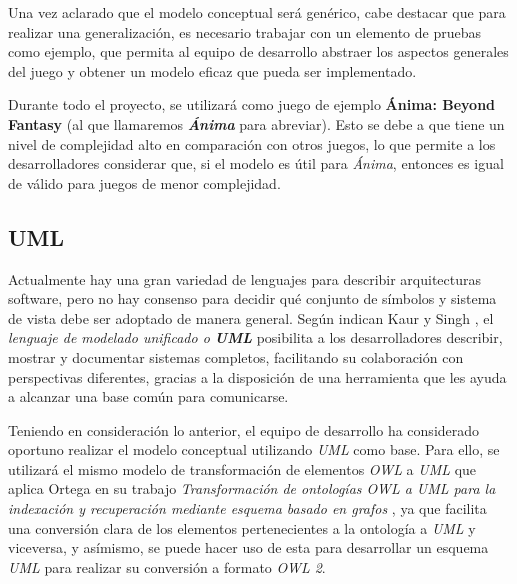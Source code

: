 Una vez aclarado que el modelo conceptual será genérico, cabe destacar que para realizar una generalización, es necesario 
trabajar con un elemento de pruebas como ejemplo, que permita al equipo de desarrollo abstraer los aspectos generales del 
juego y obtener un modelo eficaz que pueda ser implementado. \medskip 

Durante todo el proyecto, se utilizará como juego de ejemplo \textbf{Ánima: Beyond Fantasy} (al que llamaremos \textit\textbf{{Ánima}} para abreviar). Esto se debe a
que tiene un nivel de complejidad alto en comparación con otros juegos, lo que permite a los desarrolladores considerar que, 
si el modelo es útil para \textit{Ánima}, entonces es igual de válido para juegos de menor complejidad. \medskip

\subsection{UML}
Actualmente hay una gran variedad de lenguajes para describir arquitecturas software, pero no hay consenso para decidir 
qué conjunto de símbolos y sistema de vista debe ser adoptado de manera general. Según indican Kaur y Singh \autocite{Kaur2015},
el \textit{lenguaje de modelado unificado o \textbf{UML}} posibilita a los desarrolladores describir, mostrar y documentar sistemas 
completos, facilitando su colaboración con perspectivas diferentes, gracias a la disposición de una herramienta que les ayuda 
a alcanzar una base común para comunicarse. \medskip

Teniendo en consideración lo anterior, el equipo de desarrollo ha considerado oportuno realizar el modelo conceptual 
utilizando \textit{UML} como base. Para ello, se utilizará el mismo modelo de transformación de elementos \textit{OWL} a 
\textit{UML} que aplica Ortega en su trabajo \textit{Transformación de ontologías OWL a UML para la indexación y recuperación
mediante esquema basado en grafos} \autocite*{Ortega2015}, ya que facilita una conversión clara de los elementos pertenecientes 
a la ontología a \textit{UML} y viceversa, y asímismo, se puede hacer uso de esta para desarrollar un esquema \textit{UML} para 
realizar su conversión a formato \textit{OWL 2}.

